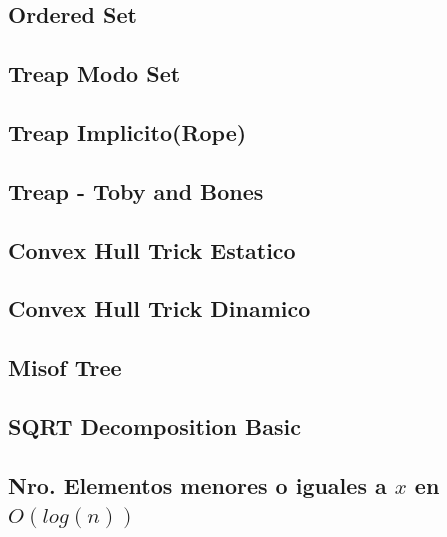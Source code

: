 \subsection{Ordered Set}

\subsection{Treap Modo Set}

\subsection{Treap Implicito(Rope)}

\subsection{Treap - Toby and Bones}

\subsection{Convex Hull Trick Estatico}

\subsection{Convex Hull Trick Dinamico}

\subsection{Misof Tree}

\subsection{SQRT Decomposition Basic}

\subsection{Nro. Elementos menores o iguales a $x$ en $O(log(n))$}


